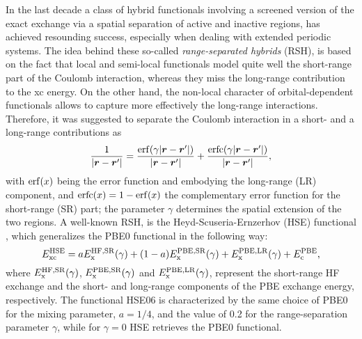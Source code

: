 In the last decade a class of hybrid functionals involving a screened version of the exact exchange via a spatial separation of active and inactive regions, has achieved resounding success, especially when dealing with extended periodic systems. The idea behind these so-called \emph{range-separated hybrids} (RSH), is based on the fact that local and semi-local functionals model quite well the short-range part of the Coulomb interaction, whereas they miss the long-range contribution to the xc energy. On the other hand, the non-local character of orbital-dependent functionals allows to capture more effectively the long-range interactions. Therefore, it was suggested to separate the Coulomb interaction in a short- and a long-range contributions as
%
\begin{equation}
    \frac{1}{|{\bm r}-{\bm r}'|} = \frac{\operatorname{erf}(\gamma |{\bm r}-{\bm r}'|)}{|{\bm r}-{\bm r}'|} + \frac{\operatorname{erfc}(\gamma |{\bm r}-{\bm r}'|)}{|{\bm r}-{\bm r}'|} ,
    \label{eq:range-separation-coulomb}
\end{equation}
%
with $\operatorname{erf}(x)$ being the error function and embodying the long-range (LR) component, and $\operatorname{erfc}(x) = 1 - \operatorname{erf}(x)$ the complementary error function for the short-range (SR) part; the parameter $\gamma$ determines the spatial extension of the two regions. A well-known RSH, is the Heyd-Scuseria-Ernzerhov (HSE) functional \cite{heyd_hybrid_2003}, which generalizes the PBE0 functional in the following way:
%
\begin{equation}
    E_{\rm xc}^{\rm HSE} = a E_{\rm x}^{\rm HF,SR}(\gamma) + (1-a) E_{\rm x}^{\rm PBE,SR}(\gamma) + E_{\rm x}^{\rm PBE,LR}(\gamma) + E_{\rm c}^{\rm PBE} ,
    \label{eq:hse-hybrid}
\end{equation}
%
where $E_{\rm x}^{\rm HF,SR}(\gamma)$, $E_{\rm x}^{\rm PBE,SR}(\gamma)$ and $E_{\rm x}^{\rm PBE,LR}(\gamma)$, represent the short-range HF exchange and the short- and long-range components of the PBE exchange energy, respectively. The functional HSE06 is characterized by the same choice of PBE0 for the mixing parameter, $a=1/4$, and the value of 0.2 for the range-separation parameter $\gamma$, while for $\gamma=0$ HSE retrieves the PBE0 functional.

